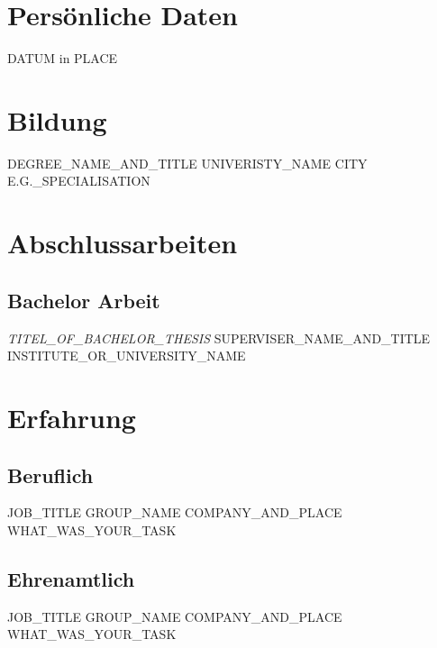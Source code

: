\documentclass[11pt,a4paper,roman]{moderncv}
\date{\today}
\begin{document}
\maketitle


\section{Pers\"onliche Daten}
            {DATUM in PLACE}


\section{Bildung}
            {DEGREE_NAME_AND_TITLE}
            {UNIVERISTY_NAME}
            {CITY}
            {}
            {E.G._SPECIALISATION}


\section{Abschlussarbeiten}
\subsection{Bachelor Arbeit}
            {\emph{TITEL_OF_BACHELOR_THESIS}}
            {SUPERVISER_NAME_AND_TITLE}
            {INSTITUTE_OR_UNIVERSITY_NAME}


\section{Erfahrung}
\subsection{Beruflich}
            {JOB_TITLE}
            {GROUP_NAME}
            {COMPANY_AND_PLACE}
            {}
            {WHAT_WAS_YOUR_TASK}


\subsection{Ehrenamtlich}
            {JOB_TITLE}
            {GROUP_NAME}
            {COMPANY_AND_PLACE}
            {}
            {WHAT_WAS_YOUR_TASK}
         
\end{document}
